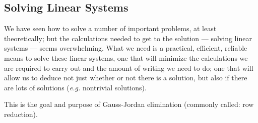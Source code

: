 % 
%
%

\begin{partbacktext}
\part{Solving Linear Systems}
\noindent 
We have seen how to solve a number of important problems, at least theoretically; but the calculations needed to get to the solution --- solving linear systems --- seems overwhelming.  What we need is a practical, efficient, reliable means to solve these linear systems, one that will minimize the calculations we are required to carry out and the amount of writing we need to do; one that will allow us to deduce not just whether or not there is a solution, but also if there are lots of solutions (\emph{e.g.} nontrivial solutions).  

This is the goal and purpose of Gauss-Jordan elimination (commonly called: row reduction).

\end{partbacktext}
